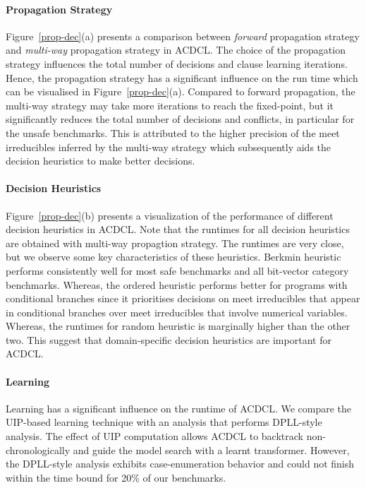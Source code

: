 \paragraph {\textbf{Propagation Strategy}}
%
Figure~\ref{prop-dec}(a) presents a comparison between {\em forward}
propagation strategy and {\em multi-way} propagation strategy in ACDCL.  The
choice of the propagation strategy influences the total number of decisions
and clause learning iterations.  Hence, the propagation strategy has a
significant influence on the run time which can be visualised in
Figure~\ref{prop-dec}(a).  Compared to forward propagation, the multi-way
strategy may take more iterations to reach the fixed-point, but it
significantly reduces the total number of decisions and conflicts, in
particular for the unsafe benchmarks.  This is attributed to the higher
precision of the meet irreducibles inferred by the multi-way strategy which
subsequently aids the decision heuristics to make better decisions.

\paragraph {\textbf{Decision Heuristics}}
%
Figure~\ref{prop-dec}(b) presents a visualization of the performance of
different decision heuristics in ACDCL.  Note that the runtimes for all
decision heuristics are obtained with multi-way propagtion strategy.  The
runtimes are very close, but we observe some key characteristics of these
heuristics.  Berkmin heuristic performs consistently well for most safe
benchmarks and all bit-vector category benchmarks.  Whereas, the ordered
heuristic performs better for programs with conditional branches since it
prioritises decisions on meet irreducibles that appear in conditional
branches over meet irreducibles that involve numerical variables.  Whereas,
the runtimes for random heuristic is marginally higher than the other two. 
This suggest that domain-specific decision heuristics are important for
ACDCL.


\paragraph {\textbf{Learning}}
%
Learning has a significant influence on the runtime of ACDCL.  We compare
the UIP-based learning technique with an analysis that performs DPLL-style 
analysis.
The effect of UIP computation allows ACDCL to backtrack non-chronologically 
and guide the model search with a learnt transformer.  However, the DPLL-style 
analysis exhibits case-enumeration behavior and could not finish within the 
time bound for 20\% of our benchmarks.

